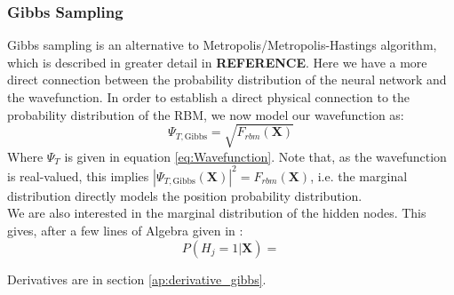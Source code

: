 \documentclass[a4paper, 10pt]{article}
\begin{document}
	\subsubsection{Gibbs Sampling}
	Gibbs sampling is an alternative to Metropolis/Metropolis-Hastings algorithm, which is described in greater detail in \textbf{REFERENCE}. Here we have a more direct connection between the probability distribution of the neural network and the wavefunction. In order to establish a direct physical connection to the probability distribution of the RBM, we now model our wavefunction as:
	\begin{equation}\label{eq:wavefunction_Gibbs}
	\Psi_{T, \mathrm{Gibbs}} =\sqrt{F_{rbm}(\boldsymbol{X})}
	\end{equation}
	Where $\Psi_T$ is given in equation \ref{eq:Wavefunction}. Note that, as the wavefunction is real-valued, this implies $|\Psi_{T, \mathrm{Gibbs}}(\boldsymbol{X})|^2 = F_{rbm}(\boldsymbol{X})$, i.e. the marginal distribution directly models the position probability distribution.\\
	\linebreak
	We are also interested in the marginal distribution of the hidden nodes. This gives, after a few lines of Algebra given in \cite{Hjorth-Jensen2018}:
	\begin{equation}
	P(H_j=1|\boldsymbol{X})=
	\end{equation}
	
	Derivatives are in section \ref{ap:derivative_gibbs}.
\end{document}
